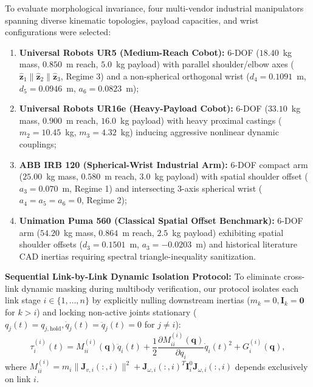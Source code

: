 \documentclass[fleqn,10pt]{article}
\begin{document}
	To evaluate morphological invariance, four multi-vendor industrial manipulators spanning diverse kinematic topologies, payload capacities, and wrist configurations were selected:
	\begin{enumerate}
		\item \textbf{Universal Robots UR5 (Medium-Reach Cobot):} 6-DOF ($18.40$~kg mass, $0.850$~m reach, $5.0$~kg payload) with parallel shoulder/elbow axes ($\hat{\bm{z}}_1 \parallel \hat{\bm{z}}_2 \parallel \hat{\bm{z}}_3$, Regime 3) and a non-spherical orthogonal wrist ($d_4 = 0.1091$~m, $d_5 = 0.0946$~m, $a_6 = 0.0823$~m);
		\item \textbf{Universal Robots UR16e (Heavy-Payload Cobot):} 6-DOF ($33.10$~kg mass, $0.900$~m reach, $16.0$~kg payload) with heavy proximal castings ($m_2 = 10.45$~kg, $m_3 = 4.32$~kg) inducing aggressive nonlinear dynamic couplings;
		\item \textbf{ABB IRB 120 (Spherical-Wrist Industrial Arm):} 6-DOF compact arm ($25.00$~kg mass, $0.580$~m reach, $3.0$~kg payload) with spatial shoulder offset ($a_3 = 0.070$~m, Regime 1) and intersecting 3-axis spherical wrist ($a_4 = a_5 = a_6 = 0$, Regime 2);
		\item \textbf{Unimation Puma 560 (Classical Spatial Offset Benchmark):} 6-DOF arm ($54.20$~kg mass, $0.864$~m reach, $2.5$~kg payload) exhibiting spatial shoulder offsets ($d_3 = 0.1501$~m, $a_3 = -0.0203$~m) and historical literature CAD inertias requiring spectral triangle-inequality sanitization.
	\end{enumerate}
	
	\noindent\textbf{Sequential Link-by-Link Dynamic Isolation Protocol:} To eliminate cross-link dynamic masking during multibody verification, our protocol isolates each link stage $i \in \{1, \dots, n\}$ by explicitly nulling downstream inertias ($m_k = 0, \bm{I}_k = \bm{0}$ for $k > i$) and locking non-active joints stationary ($q_j(t) = q_{j,\text{hold}}, \dot{q}_j(t) = \ddot{q}_j(t) = 0$ for $j \neq i$):
	\begin{equation}
		\tau_i^{(i)}(t) = M_{ii}^{(i)}(\bm{q})\ddot{q}_i(t) + \frac{1}{2}\frac{\partial M_{ii}^{(i)}(\bm{q})}{\partial q_i}\dot{q}_i(t)^2 + G_i^{(i)}(\bm{q}),
		\label{eq:isolated_link_torque}
	\end{equation}
	where $M_{ii}^{(i)} = m_i \|\bm{J}_{v,i}(:,i)\|^2 + \bm{J}_{\omega,i}(:,i)^T \bm{I}_i^0 \bm{J}_{\omega,i}(:,i)$ depends exclusively on link $i$.
	
\end{document}

